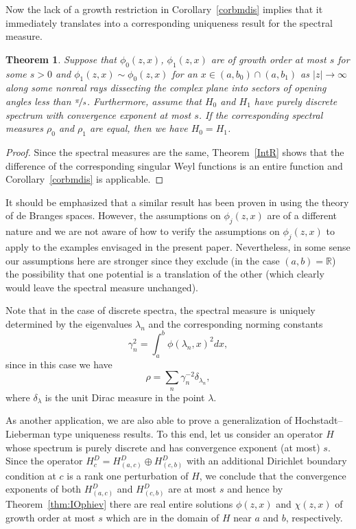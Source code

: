 \documentclass{amsart}
\newtheorem{theorem}{Theorem}[section]
\numberwithin{equation}{section}
\begin{document}
Now the lack of a growth restriction in Corollary~\ref{corbmdis} implies that it immediately translates into a corresponding uniqueness result for the spectral measure.

\begin{theorem}\label{thmSpectFuncDisc}
Suppose that $\phi_0(z,x)$, $\phi_1(z,x)$ are of growth order at most $s$ for some $s>0$ and $\phi_1(z,x)\sim\phi_0(z,x)$ for an $x\in(a,b_0)\cap(a,b_1)$ as $|z|\rightarrow\infty$ along some nonreal rays dissecting the complex plane into sectors of opening angles less than $\nicefrac{\pi}{s}$.  
Furthermore, assume that $H_0$ and $H_1$ have purely discrete spectrum with convergence exponent at most $s$. If the corresponding spectral measures $\rho_0$ and $\rho_1$ are equal, then we have $H_0=H_1$.
\end{theorem}

\begin{proof}
Since the spectral measures are the same, Theorem~\ref{IntR} shows that the difference of the corresponding singular Weyl functions is an entire function and Corollary~\ref{corbmdis} is applicable.
\end{proof}

It should be emphasized that a similar result  has been proven in \cite{je} using the theory of de Branges spaces. However, the assumptions on $\phi_j(z,x)$ are of a different nature
and we are not aware of how to verify the assumptions on $\phi_j(z,x)$ to apply \cite[Theorem~4.1]{je} to the examples envisaged in the present paper. Nevertheless,
in some sense our assumptions here are stronger since they exclude (in the case $(a,b)={{\mathbb R}}$) the possibility that one potential is a translation of the other
(which clearly would leave the spectral measure unchanged).

Note that in the case of discrete spectra, the spectral measure is uniquely determined by the eigenvalues $\lambda_n$ and the corresponding norming constants
\begin{equation}
 \gamma_n^2 = \int_a^b \phi(\lambda_n,x)^2 dx,
\end{equation}
since in this case we have
\begin{equation}
 \rho = \sum_n \gamma_n^{-2} \delta_{\lambda_n},
\end{equation}
where $\delta_{\lambda}$ is the unit Dirac measure in the point $\lambda$.

As another application, we are also able to prove a generalization of Hochstadt--Lieberman type uniqueness results.
To this end, let us consider an operator $H$ whose spectrum is purely discrete and has convergence exponent (at most) $s$.
Since the operator $H^D_c = H^D_{(a,c)} \oplus H^D_{(c,b)}$ with an additional Dirichlet boundary condition at $c$ is
a rank one perturbation of $H$, we conclude that the  convergence exponents of both $H^D_{(a,c)}$ and $H^D_{(c,b)}$ are
at most $s$ and hence by Theorem~\ref{thm:IOphiev} there are real entire solutions $\phi(z,x)$ and $\chi(z,x)$ of growth order at most $s$ which are
in the domain of $H$ near $a$ and $b$, respectively.
\end{document}
